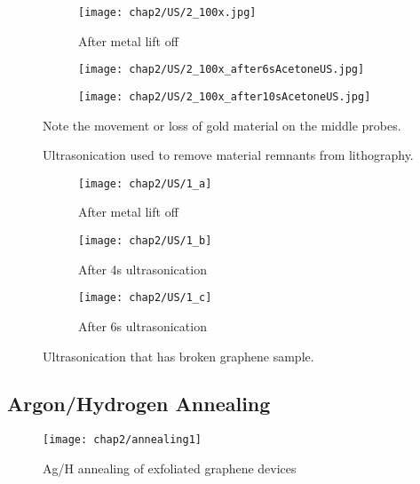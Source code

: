 \documentclass[../../Matt_Gebert_Honours_Thesis.tex]{subfiles}
\begin{document}
	\begin{figure}[H]
		\centering
		\begin{subfigure}[b]{0.3\textwidth}
			\texttt{[image: chap2/US/2\_100x.jpg]}
			\caption{After metal lift off}			
		\end{subfigure}
		\begin{subfigure}[b]{0.3\textwidth}
			\texttt{[image: chap2/US/2\_100x\_after6sAcetoneUS.jpg]}
		\end{subfigure}
		\begin{subfigure}[b]{0.3\textwidth}
			\texttt{[image: chap2/US/2\_100x\_after10sAcetoneUS.jpg]}
		\end{subfigure}
		\caption{Ultrasonication used to remove material remnants from lithography.}\label{fig:lithography_skins_us}Note the movement or loss of gold material on the middle probes.
	\end{figure}
	
	\begin{figure}[H]
		\centering
		\begin{subfigure}[b]{0.3\textwidth}
			\texttt{[image: chap2/US/1\_a]}
			\caption{After metal lift off}
		\end{subfigure}
		\begin{subfigure}[b]{0.3\textwidth}
			\texttt{[image: chap2/US/1\_b]}
			\caption{After 4s ultrasonication}
		\end{subfigure}
		\begin{subfigure}[b]{0.3\textwidth}
			\texttt{[image: chap2/US/1\_c]}
			\caption{After 6s ultrasonication}
		\end{subfigure}
		\caption{Ultrasonication that has broken graphene sample.}\label{fig:lithography_skins_break}
	\end{figure}

	\subsection{Argon/Hydrogen Annealing}\label{sec:annealing}
	\begin{wrapfigure}[9]{r}[0pt]{7cm}
		\vspace{-1.1cm}
		\centering
		\texttt{[image: chap2/annealing1]}
		\caption[Ag/H annealing]{Ag/H annealing of exfoliated graphene devices}
	\end{wrapfigure}
	
\end{document}
